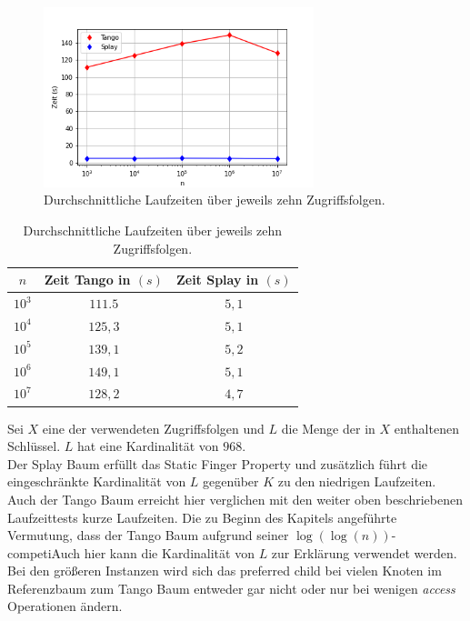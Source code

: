 \documentclass[a4paper,12pt]{article}
\begin{document}
\begin{figure}[H]
	\centering
	\includegraphics[width=0.7\textwidth]{Medien/laufzeittest/diagramm/staticfinger3}
	\caption{Durchschnittliche Laufzeiten über jeweils zehn Zugriffsfolgen.}
\end{figure}
\begin{table}[H]
	\begin{center}
		\begin{tabular}[c]{|c|c|c|}
			\hline
		$n$ & Zeit Tango in $\left(s\right)$ &Zeit Splay in $\left(s\right)$ \\
		\hline
		$10^3$ & $111.5$ &$5,1$ \\
		\hline
		$10^4$  & $125,3$ &$5,1$  \\
		\hline
		$10^5$  & $139,1$ &  $5,2$  \\
		\hline
		$10^6$  & $149,1$ &$5,1$  \\
		\hline
		$10^7$  & $128,2$ &$4,7$  \\
		\hline
		\end{tabular}
		\caption{Durchschnittliche Laufzeiten über jeweils zehn Zugriffsfolgen.} 
	\end{center}
\end{table}
\noindent Sei $X$ eine der verwendeten Zugriffsfolgen und $L$ die Menge der in $X$ enthaltenen Schlüssel. $L$ hat eine Kardinalität von $968$. \\
Der Splay Baum erfüllt das Static Finger Property und zusätzlich führt die eingeschränkte Kardinalität von  $L$ gegenüber $K$ zu den niedrigen Laufzeiten.     
Auch der Tango Baum erreicht hier verglichen mit den weiter oben beschriebenen Laufzeittests kurze Laufzeiten. Die zu Beginn des Kapitels angeführte Vermutung, dass der Tango Baum aufgrund seiner $\log\left(\log\left(n\right)\right)$-competiAuch hier kann die Kardinalität von $L$ zur Erklärung verwendet werden. Bei den größeren Instanzen wird sich das preferred child bei vielen Knoten im Referenzbaum zum Tango Baum entweder gar nicht oder nur bei wenigen \textit{access} Operationen ändern. \\
\end{document}
